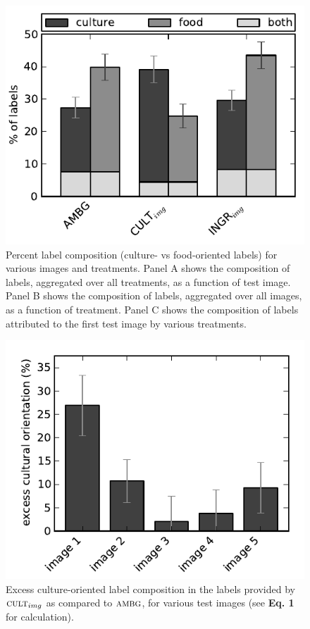 \documentclass[a4paper]{report}
\begin{document}
\begin{figure}
	\includegraphics{../figs/orientationVsTreatment.pdf}
	\caption{Percent label composition (culture- vs food-oriented labels) for 
		various images and treatments.  Panel A shows the composition of 
		labels, aggregated over all treatments, as a function of test image.
		Panel B shows the composition of labels, aggregated over all images, as
		a function of treatment.  Panel C shows the composition of labels 
		attributed to the first test image by various treatments.}
\end{figure}

\begin{figure}
	\includegraphics{../figs/excessCultureVsTreatment-t1.pdf}
	\caption{Excess culture-oriented label composition in the labels provided
		by $\textsc{cult}_{img}$ as compared to $\textsc{ambg}$, for various
		test images (see \textbf{Eq. 1} for calculation).
	}
\end{figure}
\end{document}
